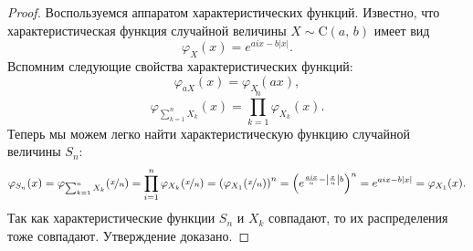 \begin{proof}
        Воспользуемся аппаратом характеристических функций. Известно, что характеристическая функция случайной величины $X\sim\mbox{C}(a,\,b)$ имеет вид
$$
        \varphi_X(x) = e^{aix - b|x|}.
$$
        Вспомним следующие свойства характеристических функций:
$$
        \varphi_{aX}(x) = \varphi_X(ax),
$$
$$
        \varphi_{\sum_{k = 1}^{n}X_k}(x) = \prod_{k = 1}^{n} \varphi_{X_k}(x).
$$
Теперь мы можем легко найти характеристическую функцию случайной величины $S_n$:
$$
        \varphi_{S_n}(x)
        =
        \varphi_{\sum_{k = 1}^{n}X_k}(\nicefrac{x}{n})
        =
        \prod_{i = 1}^n \varphi_{X_k}(\nicefrac{x}{n})
        =
        \left(
                \varphi_{X_1}(\nicefrac{x}{n})
        \right)^n
        =
        \left(
                e^{\frac{aix}{n} - \left|\frac{x}{n}\right|b}
        \right)^n
        =
        e^{aix - b|x|}
        =
        \varphi_{X_1}(x).
$$
Так как характеристические функции $S_n$ и $X_k$ совпадают, то их распределения тоже совпадают. Утверждение доказано.
\end{proof}

